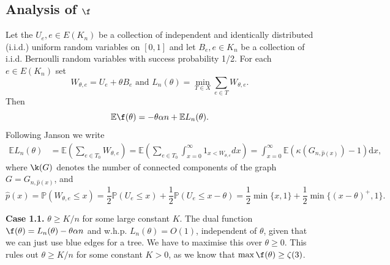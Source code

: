 \documentclass[12pt]{article}
\newcommand{\1}{\textbf{1}}
\def\a{\alpha} \def\b{\beta} \def\d{\delta} \def\D{\Delta}
\def\z{\zeta} \def\th{\theta} \def\TH{\Theta} \def\Th{\Theta}  \def\l{\lambda}
\newcommand{\brac}[1]{\left(#1\right)}
\def\dd{\text{d}}
\def\E{\mathbb{E}}
\def\Pr{\mathbb{P}}
\begin{document}
\subsection{Analysis of $\f$}
Let the $U_e,e\in E(K_n)$ be a collection of independent and identically distributed (i.i.d.) uniform random variables on $[0,1]$ and let $B_e,e\in K_n$ be a collection of i.i.d. Bernoulli random variables with success probability 1/2. For each $e\in E(K_{n})$ set 
\[
W_{\th,e} = U_e + \theta B_e\text{ and }L_n(\th) = \min_{T \in X} \sum_{e \in T} W_{\th,e}.
\]
Then
\[
\E\f(\th)=-\th\a n+\E L_n(\th).
\]
Following Janson \cite{J1} we write
\begin{align*}
\E L_n(\th)& = \E\brac{ \sum_{e \in T_0} W_{\th,e}} = \E\brac{ \sum_{e \in T_0} \int_{x=0}^\infty1_{ { x < W_{\th,e}}}dx}=\int_{x=0}^\infty \E(\kappa(G_{n,\hat p(x)})-1) \dd x,
\end{align*}
where $\k(G)$ denotes the number of connected components of the graph $G=G_{n,\hat p(x)}$, and 
\[
\hat p(x) = \Pr(W_{\th,e} \leq x) =\frac12\Pr(U_e \leq x) + \frac12\Pr(U_e \leq x - \th) = \frac12\min\{x,1\} +\frac12\min\{(x-\theta)^+,1\}.
\]


\bigskip\noindent
 \textbf{Case 1.1.} $\theta\ge K/n$ for some large constant $K$. 
The dual function $\f(\th)=L_n(\th)-\th\a n$ and w.h.p. $L_n(\th)=O(1)$, independent of $\th$, given that we can just use blue edges for a tree. We have to maximise this over $\th\geq 0$. This rules out $\th\geq K/n$ for some constant $K>0$, as we know that $\max\f(\th)\geq \z(3)$.
\end{document}

